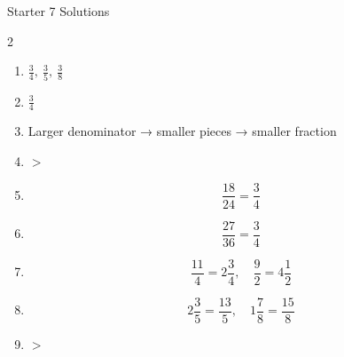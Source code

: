 \documentclass{beamer}
\begin{document}
\begin{frame}{Starter 7 Solutions}

\begin{multicols}{2}

\begin{enumerate}

\item $\frac{3}{4},\ \frac{3}{5},\ \frac{3}{8}$

\item $\frac{3}{4}$

\item Larger denominator → smaller pieces → smaller fraction

\item $>$

\item 
\[
\frac{18}{24}=\frac{3}{4}
\]

\columnbreak

\item 
\[
\frac{27}{36}=\frac{3}{4}
\]

\item 
\[
\frac{11}{4}=2\frac{3}{4},\quad
\frac{9}{2}=4\frac{1}{2}
\]

\item 
\[
2\frac{3}{5}=\frac{13}{5},\quad
1\frac{7}{8}=\frac{15}{8}
\]

\item $>$

\end{enumerate}

\end{multicols}

\end{frame}
\end{document}
